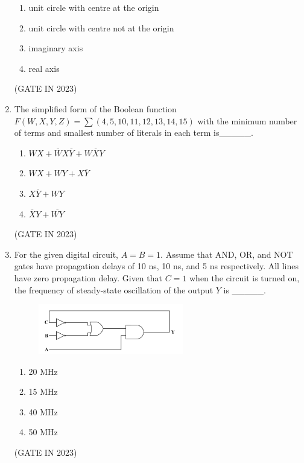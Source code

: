 \documentclass[journal]{IEEEtran}
\begin{document}
\begin{enumerate}
    \begin{enumerate}
        \item unit circle with centre at the origin
        \item unit circle with centre not at the origin
        \item imaginary axis
        \item real axis
    \end{enumerate}
    \hfill(GATE IN 2023)

    \item The simplified form of the Boolean function $F(W, X, Y, Z) = \sum (4, 5, 10, 11, 12, 13, 14, 15)$ with the minimum number of terms and smallest number of literals in each term is\_\_\_\_\_.
    
    \begin{enumerate}
        \item $WX + \overline{W}X\overline{Y} + W\overline{X}Y$
        \item $WX + WY + X\overline{Y}$
        \item $X\overline{Y} + WY$
        \item $\overline{X}Y + \overline{WY}$
    \end{enumerate}
    \hfill(GATE IN 2023)

    \item For the given digital circuit, $A = B = 1$. Assume that AND, OR, and NOT gates have propagation delays of 10 ns, 10 ns, and 5 ns respectively. All lines have zero propagation delay. Given that $C = 1$ when the circuit is turned on, the frequency of steady-state oscillation of the output $Y$ is \_\_\_\_\_.
    \begin{figure}[H]
    \centering
      \includegraphics[width=0.6\textwidth]{20.png} 
      \caption{}
    \label{fig:fig20} 
\end{figure}
    \begin{enumerate}
        \item 20 MHz
        \item 15 MHz
        \item 40 MHz
        \item 50 MHz
    \end{enumerate}
    \hfill(GATE IN 2023)


\end{enumerate}
\end{document}
